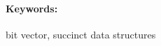 \documentclass[12pt, twoside]{book}
\begin{document}
\paragraph*{Keywords:} bit vector, succinct data structures


%
%



\newpage 

\tableofcontents



\newpage 



\mainmatter


% 









%

%

%





\newpage	

\backmatter

\thispagestyle{empty}
\clearpage


 

 
\end{document}
